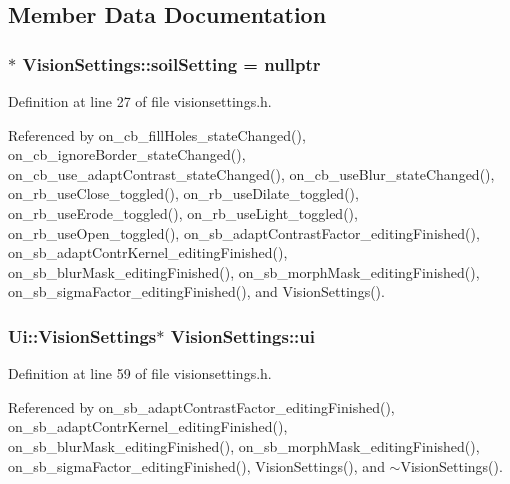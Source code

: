 \subsection{Member Data Documentation}
\hypertarget{class_vision_settings_ad2edb496bf1bf72e2f36d23ae2a28b30}{}
\subsubsection[{soil\+Setting}]{$\ast$ Vision\+Settings\+::soil\+Setting = nullptr}\label{class_vision_settings_ad2edb496bf1bf72e2f36d23ae2a28b30}


Definition at line 27 of file visionsettings.\+h.



Referenced by on\+\_\+cb\+\_\+fill\+Holes\+\_\+state\+Changed(), on\+\_\+cb\+\_\+ignore\+Border\+\_\+state\+Changed(), on\+\_\+cb\+\_\+use\+\_\+adapt\+Contrast\+\_\+state\+Changed(), on\+\_\+cb\+\_\+use\+Blur\+\_\+state\+Changed(), on\+\_\+rb\+\_\+use\+Close\+\_\+toggled(), on\+\_\+rb\+\_\+use\+Dilate\+\_\+toggled(), on\+\_\+rb\+\_\+use\+Erode\+\_\+toggled(), on\+\_\+rb\+\_\+use\+Light\+\_\+toggled(), on\+\_\+rb\+\_\+use\+Open\+\_\+toggled(), on\+\_\+sb\+\_\+adapt\+Contrast\+Factor\+\_\+editing\+Finished(), on\+\_\+sb\+\_\+adapt\+Contr\+Kernel\+\_\+editing\+Finished(), on\+\_\+sb\+\_\+blur\+Mask\+\_\+editing\+Finished(), on\+\_\+sb\+\_\+morph\+Mask\+\_\+editing\+Finished(), on\+\_\+sb\+\_\+sigma\+Factor\+\_\+editing\+Finished(), and Vision\+Settings().

\hypertarget{class_vision_settings_a31bed09e4ffe883c2f352ecbb3682a8f}{}
\subsubsection[{ui}]{\setlength{\rightskip}{0pt plus 5cm}Ui\+::\+Vision\+Settings$\ast$ Vision\+Settings\+::ui\hspace{0.3cm}{\ttfamily [private]}}\label{class_vision_settings_a31bed09e4ffe883c2f352ecbb3682a8f}


Definition at line 59 of file visionsettings.\+h.



Referenced by on\+\_\+sb\+\_\+adapt\+Contrast\+Factor\+\_\+editing\+Finished(), on\+\_\+sb\+\_\+adapt\+Contr\+Kernel\+\_\+editing\+Finished(), on\+\_\+sb\+\_\+blur\+Mask\+\_\+editing\+Finished(), on\+\_\+sb\+\_\+morph\+Mask\+\_\+editing\+Finished(), on\+\_\+sb\+\_\+sigma\+Factor\+\_\+editing\+Finished(), Vision\+Settings(), and $\sim$\+Vision\+Settings().



